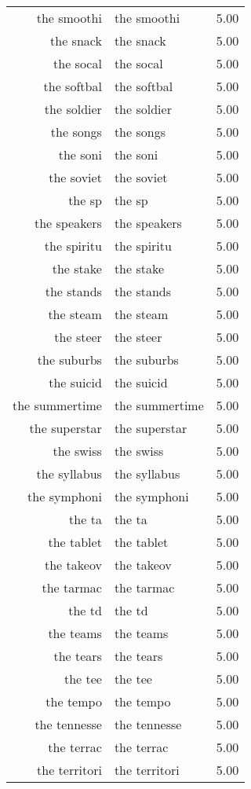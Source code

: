 \begin{table}[ht]
\begin{tabular}{rlr}
  the smoothi & the smoothi & 5.00 \\ 
  the snack & the snack & 5.00 \\ 
  the socal & the socal & 5.00 \\ 
  the softbal & the softbal & 5.00 \\ 
  the soldier & the soldier & 5.00 \\ 
  the songs & the songs & 5.00 \\ 
  the soni & the soni & 5.00 \\ 
  the soviet & the soviet & 5.00 \\ 
  the sp & the sp & 5.00 \\ 
  the speakers & the speakers & 5.00 \\ 
  the spiritu & the spiritu & 5.00 \\ 
  the stake & the stake & 5.00 \\ 
  the stands & the stands & 5.00 \\ 
  the steam & the steam & 5.00 \\ 
  the steer & the steer & 5.00 \\ 
  the suburbs & the suburbs & 5.00 \\ 
  the suicid & the suicid & 5.00 \\ 
  the summertime & the summertime & 5.00 \\ 
  the superstar & the superstar & 5.00 \\ 
  the swiss & the swiss & 5.00 \\ 
  the syllabus & the syllabus & 5.00 \\ 
  the symphoni & the symphoni & 5.00 \\ 
  the ta & the ta & 5.00 \\ 
  the tablet & the tablet & 5.00 \\ 
  the takeov & the takeov & 5.00 \\ 
  the tarmac & the tarmac & 5.00 \\ 
  the td & the td & 5.00 \\ 
  the teams & the teams & 5.00 \\ 
  the tears & the tears & 5.00 \\ 
  the tee & the tee & 5.00 \\ 
  the tempo & the tempo & 5.00 \\ 
  the tennesse & the tennesse & 5.00 \\ 
  the terrac & the terrac & 5.00 \\ 
  the territori & the territori & 5.00 \\ 

\end{tabular}
\end{table}

